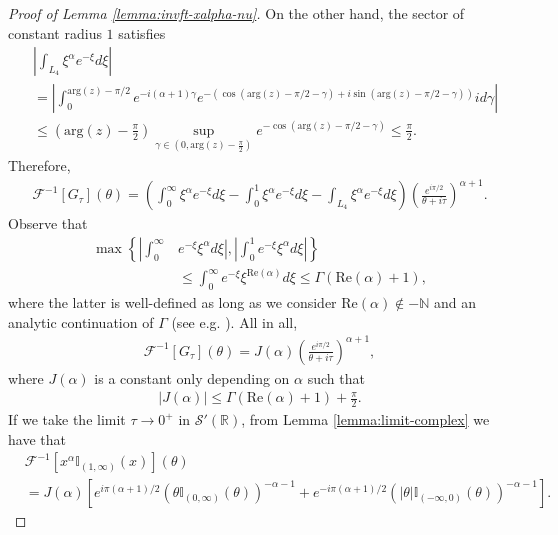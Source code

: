 \documentclass[a4paper, reqno, 11pt]{amsart}
\theoremstyle{definition}
\begin{document}
\begin{proof}[Proof of Lemma \ref{lemma:invft-xalpha-nu}]
	On the other hand, the sector of constant radius $1$ satisfies
	\begin{align*}
		&\left|\int_{L_4}\xi^{\alpha} e^{-\xi} d\xi \right| \nonumber \\
		&= \left| \int_0^{\text{arg}(z) - \pi/2}  e^{-i (\alpha + 1) \gamma} e^{-(\cos(\text{arg}(z) - \pi/2-\gamma) + i \sin(\text{arg}(z) - \pi/2-\gamma))} i d\gamma \right|  \nonumber\\
		&\leq  \left( \text{arg}(z) - \frac{\pi}{2} \right) \sup_{\gamma \in (0,\text{arg}(z)-\frac{\pi}{2})} e^{- \cos(\text{arg}(z) - \pi/2-\gamma)} \leq \frac{\pi}{2}.
	\end{align*}
	Therefore,
	\begin{align*}
	\mathcal{F}^{-1}[G_{\tau}](\theta) = \left(\int_0^{\infty} \xi^{\alpha} e^{-\xi} d\xi - \int_0^1 \xi^{\alpha} e^{-\xi} d\xi - \int_{L_4}\xi^{\alpha} e^{-\xi} d\xi \right)\left( \frac{e^{i\pi/2}}{\theta + i \tau} \right)^{\alpha+1}.
	\end{align*}
	Observe that
\begin{align*}
\max\left\{ \left|\int_0^{\infty} \right. \right. & \left. \left. e^{-\xi} \xi^{\alpha} d\xi \right| , \left|\int_0^{1} e^{-\xi} \xi^{\alpha} d\xi \right| \right\} \\
&\leq \int_0^{\infty} e^{-\xi} \xi^{\text{Re}(\alpha)} d\xi \leq \Gamma(\text{Re}(\alpha) + 1),
\end{align*}
where the latter is well-defined as long as we consider $\text{Re}(\alpha) \notin -\mathbb{N}$ and an analytic continuation of $\Gamma$ (see e.g. \cite{steinshak-complex}).
All in all,
\begin{align}\label{eq:ftransform-x+exp-translation}
\mathcal{F}^{-1}[G_{\tau}](\theta) = J(\alpha)  \left( \frac{e^{i\pi/2}}{\theta + i \tau} \right)^{\alpha+1},
\end{align}
where $J(\alpha)$ is a constant only depending on $\alpha$ such that
\begin{align*}
|J(\alpha)| \leq  \Gamma(\text{Re}(\alpha)+1) + \frac{\pi}{2}.
\end{align*}
If we take the limit $\tau \rightarrow 0^+$ in $\mathcal{S}'(\mathbb{R})$, from Lemma \ref{lemma:limit-complex} we have that
\begin{align}\label{eq:ftransform_x+-translation}
&\mathcal{F}^{-1}[x^{\alpha}\mathbb{I}_{(1,\infty)}(x)](\theta) \nonumber \\
&= J(\alpha)  [e^{i\pi(\alpha+1)/2} (\theta \mathbb{I}_{(0,\infty)}(\theta))^{-\alpha-1} + e^{-i\pi(\alpha+1)/2} (|\theta| \mathbb{I}_{(-\infty,0)}(\theta))^{-\alpha-1}].
\end{align}
\end{proof}
\end{document}
